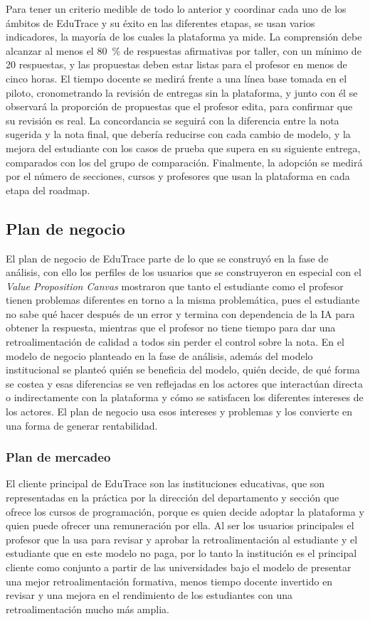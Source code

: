 \documentclass[letterpaper, 10 pt, conference]{ieeeconf}
\begin{document}
Para tener un criterio medible de todo lo anterior y coordinar cada uno de los ámbitos de EduTrace y su éxito en las diferentes etapas, se usan varios indicadores, la mayoría de los cuales la plataforma ya mide.
La comprensión debe alcanzar al menos el 80~\% de respuestas afirmativas por taller, con un mínimo de 20 respuestas, y las propuestas deben estar listas para el profesor en menos de cinco horas.
El tiempo docente se medirá frente a una línea base tomada en el piloto, cronometrando la revisión de entregas sin la plataforma, y junto con él se observará la proporción de propuestas que el profesor edita, para confirmar que su revisión es real.
La concordancia se seguirá con la diferencia entre la nota sugerida y la nota final, que debería reducirse con cada cambio de modelo, y la mejora del estudiante con los casos de prueba que supera en su siguiente entrega, comparados con los del grupo de comparación.
Finalmente, la adopción se medirá por el número de secciones, cursos y profesores que usan la plataforma en cada etapa del roadmap. 
\subsection{Plan de negocio}
El plan de negocio de EduTrace parte de lo que se construyó en la fase de análisis, con ello los perfiles de los usuarios que se construyeron en especial con el 
\textit{Value Proposition Canvas} mostraron que tanto el estudiante como el profesor tienen problemas diferentes en torno a la misma problemática, pues el estudiante 
no sabe qué hacer después de un error y termina con dependencia de la IA para obtener la respuesta, mientras que el profesor no tiene tiempo para dar una retroalimentación de calidad a todos sin perder el control sobre la nota. 
En el modelo de negocio planteado en la fase de análisis, además del modelo institucional se planteó quién se beneficia del modelo, quién decide, de qué forma se costea y esas diferencias se ven reflejadas en los actores
que interactúan directa o indirectamente con la plataforma y cómo se satisfacen los diferentes intereses de los actores. El plan de negocio usa esos intereses y problemas y los convierte en una forma de generar rentabilidad.
\subsubsection{Plan de mercadeo}
El cliente principal de EduTrace son las instituciones educativas, que son representadas en la práctica por la dirección del departamento y sección que ofrece los cursos de programación, porque es quien decide adoptar la plataforma y quien puede ofrecer una remuneración por ella. 
Al ser los usuarios principales el profesor que la usa para revisar y aprobar la retroalimentación al estudiante y el estudiante que en este modelo no paga, 
por lo tanto la institución es el principal cliente como conjunto a partir de las universidades bajo el modelo de presentar una mejor retroalimentación formativa, menos tiempo docente invertido en revisar y una mejora en el rendimiento de los estudiantes con una retroalimentación mucho más amplia. 
\end{document}
